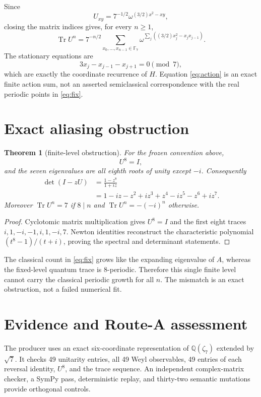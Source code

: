 \documentclass[11pt]{article}
\newtheorem{theorem}{Theorem}
\newcommand{\Tr}{\operatorname{Tr}}
\newcommand{\F}{\mathbb F}
\begin{document}
Since
\[
 U_{xy}=7^{-1/2}\omega^{(3/2)x^2-xy},
\]
closing the matrix indices gives, for every $n\ge1$,
\begin{equation}\label{eq:action}
 \Tr U^n=7^{-n/2}
 \sum_{x_0,\ldots,x_{n-1}\in\F_7}
 \omega^{\sum_j((3/2)x_j^2-x_jx_{j-1})}.
\end{equation}
The stationary equations are
\[
 3x_j-x_{j-1}-x_{j+1}=0\pmod7,
\]
which are exactly the coordinate recurrence of $H$.  Equation
\eqref{eq:action} is an exact finite action sum, not an asserted
semiclassical correspondence with the real periodic points in
\eqref{eq:fix}.

\section{Exact aliasing obstruction}

\begin{theorem}[finite-level obstruction]\label{thm:alias}
For the frozen convention above,
\[
 U^8=I,
\]
and the seven eigenvalues are all eighth roots of unity except $-i$.
Consequently
\begin{align}
 \det(I-zU)
 &=\frac{1-z^8}{1+iz}\label{eq:det}\\
 &=1-iz-z^2+iz^3+z^4-iz^5-z^6+iz^7.
\end{align}
Moreover $\Tr U^n=7$ if $8\mid n$ and
$\Tr U^n=-(-i)^n$ otherwise.
\end{theorem}

\begin{proof}
Cyclotomic matrix multiplication gives $U^8=I$ and the first eight traces
$i,1,-i,-1,i,1,-i,7$.  Newton identities reconstruct the characteristic
polynomial $(t^8-1)/(t+i)$, proving the spectral and determinant statements.
\end{proof}

The classical count in \eqref{eq:fix} grows like the expanding eigenvalue of
$A$, whereas the fixed-level quantum trace is 8-periodic.  Therefore this
single finite level cannot carry the classical periodic growth for all $n$.
The mismatch is an exact obstruction, not a failed numerical fit.

\section{Evidence and Route-A assessment}

The producer uses an exact six-coordinate representation of
$\mathbb Q(\zeta_7)$ extended by $\sqrt7$.  It checks 49 unitarity entries,
all 49 Weyl observables, 49 entries of each reversal identity, $U^8$, and the
trace sequence.  An independent complex-matrix checker, a SymPy pass,
deterministic replay, and thirty-two semantic mutations provide orthogonal
controls.
\end{document}
